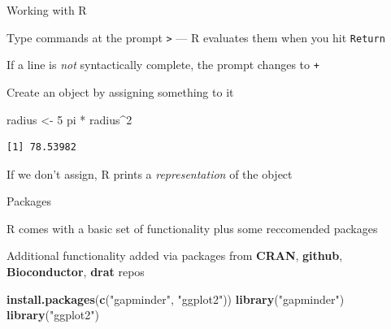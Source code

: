 \documentclass[10pt,ignorenonframetext,compress, aspectratio=169]{beamer}
\newenvironment{Shaded}{\begin{snugshade}}{\end{snugshade}}
\newcommand{\KeywordTok}[1]{\textcolor[rgb]{0.13,0.29,0.53}{\textbf{{#1}}}}
\newcommand{\DecValTok}[1]{\textcolor[rgb]{0.00,0.00,0.81}{{#1}}}
\newcommand{\StringTok}[1]{\textcolor[rgb]{0.31,0.60,0.02}{{#1}}}
\newcommand{\NormalTok}[1]{{#1}}
\begin{document}
\begin{frame}[fragile]{Working with R}

Type commands at the prompt \texttt{\textgreater{}} --- R evaluates them
when you hit \texttt{Return}

If a line is \emph{not} syntactically complete, the prompt changes to
\texttt{+}

Create an object by assigning something to it

\scriptsize

\begin{Shaded}
\begin{Highlighting}[]
\NormalTok{radius <-}\StringTok{ }\DecValTok{5}
\NormalTok{pi *}\StringTok{ }\NormalTok{radius^}\DecValTok{2}
\end{Highlighting}
\end{Shaded}

\begin{verbatim}
[1] 78.53982
\end{verbatim}

\normalsize

If we don't assign, R prints a \emph{representation} of the object

\end{frame}

\begin{frame}[fragile]{Packages}

R comes with a basic set of functionality plus some \alert{reccomended}
packages

Additional functionality added via \alert{packages} from \textbf{CRAN},
\textbf{github}, \textbf{Bioconductor}, \textbf{drat} repos

\scriptsize

\begin{Shaded}
\begin{Highlighting}[]
\KeywordTok{install.packages}\NormalTok{(}\KeywordTok{c}\NormalTok{(}\StringTok{"gapminder"}\NormalTok{, }\StringTok{"ggplot2"}\NormalTok{))}
\KeywordTok{library}\NormalTok{(}\StringTok{"gapminder"}\NormalTok{)}
\KeywordTok{library}\NormalTok{(}\StringTok{"ggplot2"}\NormalTok{)}
\end{Highlighting}
\end{Shaded}

\normalsize

\end{frame}
\end{document}
